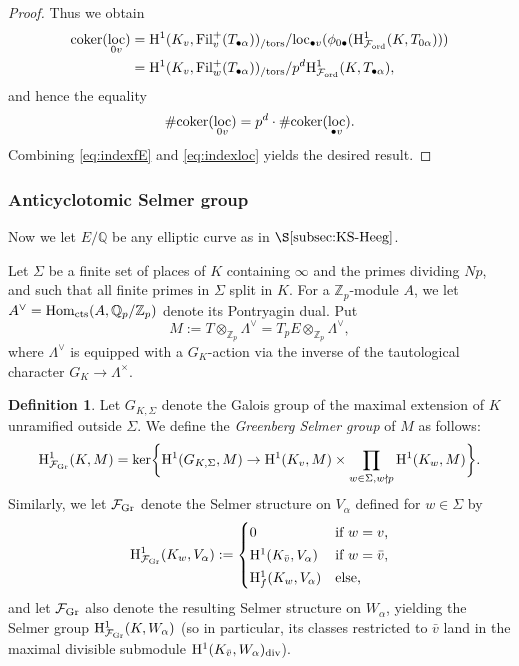 \documentclass[10pt,reqno]{amsart}
\numberwithin{equation}{section}
\theoremstyle{plain}
\theoremstyle{definition}
\newtheorem{defi}[thm]{Definition}
\theoremstyle{definition}
\theoremstyle{plain}
\theoremstyle{plain}
\theoremstyle{plain}
\theoremstyle{plain}
\theoremstyle{plain}
\theoremstyle{plain}
\newcommand{\Fil}{\mathrm{Fil}}
\newcommand{\Z}{\mathbb{Z}}
\newcommand{\Q}{\mathbb{Q}}
\DeclareMathOperator{\loc}{loc}
\newcommand{\Fcal}{\mathcal{F}}
\newcommand{\rH}{\mathrm{H}}
\begin{document}
\begin{proof}
Thus we obtain 
\begin{align*}
{\rm coker}(\loc_{0v})&=\rH^1(K_v,\Fil_v^+(T_{\bullet \alpha}))_{/ \rm tors}/{\rm loc}_{\bullet v}(\phi_{0\bullet}(\rH^1_{\Fcal_{\rm ord}}(K,T_{0\alpha})))\\
&=\rH^1(K_v,\Fil_w^+(T_{\bullet\alpha}))_{/ \rm tors}/p^d\rH^1_{\Fcal_{\rm ord}}(K,T_{\bullet\alpha}),
\end{align*}
and hence the equality 
\begin{equation}\label{eq:indexloc}
\#{\rm coker}(\loc_{0v})=p^d\cdot\#{\rm coker}(\loc_{\bullet v}).
\end{equation}
Combining \eqref{eq:indexfE} and \eqref{eq:indexloc} yields the desired result.
\end{proof}

 
\subsubsection{Anticyclotomic Selmer group}

Now we let $E/\Q$ be any elliptic curve as in $\S\ref{subsec:KS-Heeg}$. 

Let $\Sigma$ be a finite set of places of $K$ containing $\infty$ and the primes dividing $Np$, and such that all finite primes in $\Sigma$ split in $K$.
For a  $\Z_p$-module $A$, we let $A^\vee={\rm Hom}_{\rm cts}(A,\Q_p/\Z_p)$ denote its Pontryagin dual. Put
\[
M:=T\otimes_{\Z_p}\Lambda^\vee=T_pE\otimes_{\Z_p} \Lambda^{\vee},
\]
where $\Lambda^{\vee}$ is equipped with a $G_K$-action via the inverse of the tautological character $G_K\rightarrow\Lambda^\times$. 

\begin{defi}Let $G_{K,\Sigma}$ denote the Galois group of the maximal extension of $K$ unramified outside $\Sigma$. We define the \emph{Greenberg Selmer group} of $M$ as follows:
\begin{equation}\notag
\rH^1_{\Fcal_{\rm Gr}}(K, M)=\ker \biggl\{\rH^1(G_{K,\Sigma},M) \to {\rH^1(K_v,M)}\times \prod_{w\in\Sigma,w\nmid p}\rH^1(K_w, M)\biggr\}.
\end{equation}
Similarly, we let $\mathcal{F}_{\rm Gr}$ denote the Selmer structure on $V_\alpha$ defined for $w\in\Sigma$ by
\[
\rH^1_{\Fcal_{\rm Gr}}(K_w,V_\alpha):=
\begin{cases}
0&\textrm{if $w=v$,}\\[0.2em]
\rH^1(K_{\bar{v}},V_\alpha) & \textrm{if $w=\bar{v}$,}\\[0.2em]
\rH^1_f(K_w,V_\alpha)& \textrm{else,}
\end{cases}
\]
and let $\Fcal_{\rm Gr}$ also denote the resulting  Selmer structure on  $W_\alpha$, yielding the Selmer group $\rH^1_{\Fcal_{\rm Gr}}(K,W_\alpha)$ (so in particular, its classes restricted to $\bar{v}$ land in the maximal divisible submodule $\rH^1(K_{\bar{v}},W_\alpha)_{\rm div}$).
\end{defi}
\end{document}
